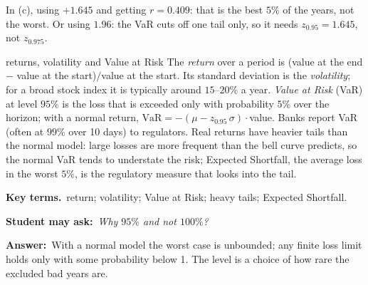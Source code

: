 \documentclass[11pt,a4paper,parskip=half]{scrartcl}
\newcommand{\terms}{\par\textbf{\color{plum}Key terms.}\ }
\newcommand{\sq}[1]{\par\textbf{\color{plum}Student may ask:}\ \emph{#1}\par}
\newcommand{\ans}{\textbf{Answer:}\ }
\begin{document}
\begin{mistake}
	In (c), using $+1.645$ and getting $r=0.409$: that is the best $5\%$ of
	the years, not the worst. Or using $1.96$: the VaR cuts off one tail
	only, so it needs $z_{0.95}=1.645$, not $z_{0.975}$.
\end{mistake}

\begin{bg}{returns, volatility and Value at Risk}
	The \emph{return} over a period is (value at the end $-$ value at the
	start)$/$value at the start. Its standard deviation is the
	\emph{volatility}; for a broad stock index it is typically around
	$15$--$20\%$ a year. \emph{Value at Risk} (VaR) at level $95\%$ is the
	loss that is exceeded only with probability $5\%$ over the horizon;
	with a normal return, $\text{VaR}=-(\mu-z_{0.95}\,\sigma)\cdot$value.
	Banks report VaR (often at $99\%$ over 10 days) to regulators.
	Real returns have heavier tails than the normal model: large losses are
	more frequent than the bell curve predicts, so the normal VaR tends to
	understate the risk; Expected Shortfall, the average loss in the worst
	$5\%$, is the regulatory measure that looks into the tail.

	\terms return; volatility; Value at Risk; heavy tails; Expected
	Shortfall.

	\sq{Why $95\%$ and not $100\%$?}
	\ans With a normal model the worst case is unbounded; any finite loss
	limit holds only with some probability below 1. The level is a choice
	of how rare the excluded bad years are.
\end{bg}
\end{document}
